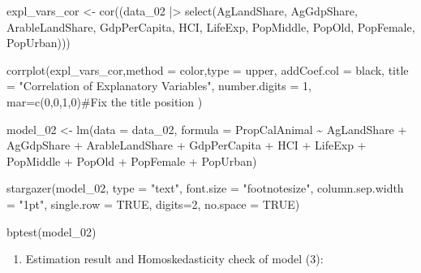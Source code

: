 \documentclass[
  letterpaper,
  DIV=11,
  numbers=noendperiod]{scrartcl}
\newenvironment{Shaded}{\begin{snugshade}}{\end{snugshade}}
\newcommand{\AttributeTok}[1]{\textcolor[rgb]{0.40,0.45,0.13}{#1}}
\newcommand{\CommentTok}[1]{\textcolor[rgb]{0.37,0.37,0.37}{#1}}
\newcommand{\ConstantTok}[1]{\textcolor[rgb]{0.56,0.35,0.01}{#1}}
\newcommand{\DecValTok}[1]{\textcolor[rgb]{0.68,0.00,0.00}{#1}}
\newcommand{\FunctionTok}[1]{\textcolor[rgb]{0.28,0.35,0.67}{#1}}
\newcommand{\NormalTok}[1]{\textcolor[rgb]{0.00,0.23,0.31}{#1}}
\newcommand{\OtherTok}[1]{\textcolor[rgb]{0.00,0.23,0.31}{#1}}
\newcommand{\SpecialCharTok}[1]{\textcolor[rgb]{0.37,0.37,0.37}{#1}}
\newcommand{\StringTok}[1]{\textcolor[rgb]{0.13,0.47,0.30}{#1}}
\providecommand{\tightlist}{%
  \setlength{\itemsep}{0pt}\setlength{\parskip}{0pt}}\usepackage{longtable,booktabs,array}
\begin{document}
\begin{Shaded}
\begin{Highlighting}[]
\NormalTok{expl\_vars\_cor }\OtherTok{\textless{}{-}} \FunctionTok{cor}\NormalTok{((data\_02 }\SpecialCharTok{|\textgreater{}}  \FunctionTok{select}\NormalTok{(AgLandShare, AgGdpShare, ArableLandShare, GdpPerCapita, HCI, LifeExp, PopMiddle, PopOld, PopFemale, PopUrban)))}

\FunctionTok{corrplot}\NormalTok{(expl\_vars\_cor,}\AttributeTok{method =} \StringTok{\textquotesingle{}color\textquotesingle{}}\NormalTok{,}\AttributeTok{type =} \StringTok{\textquotesingle{}upper\textquotesingle{}}\NormalTok{, }\AttributeTok{addCoef.col =} \StringTok{\textquotesingle{}black\textquotesingle{}}\NormalTok{, }
         \AttributeTok{title =} \StringTok{"Correlation of Explanatory Variables"}\NormalTok{,}
         \AttributeTok{number.digits =} \DecValTok{1}\NormalTok{,  }\AttributeTok{mar=}\FunctionTok{c}\NormalTok{(}\DecValTok{0}\NormalTok{,}\DecValTok{0}\NormalTok{,}\DecValTok{1}\NormalTok{,}\DecValTok{0}\NormalTok{)}\CommentTok{\#Fix the title position}
\NormalTok{         )}

\NormalTok{model\_02 }\OtherTok{\textless{}{-}} \FunctionTok{lm}\NormalTok{(}\AttributeTok{data =}\NormalTok{ data\_02, }
               \AttributeTok{formula =}\NormalTok{ PropCalAnimal }\SpecialCharTok{\textasciitilde{}}\NormalTok{ AgLandShare }\SpecialCharTok{+}\NormalTok{ AgGdpShare }\SpecialCharTok{+} 
\NormalTok{                 ArableLandShare }\SpecialCharTok{+}\NormalTok{ GdpPerCapita }\SpecialCharTok{+}\NormalTok{ HCI }\SpecialCharTok{+}\NormalTok{ LifeExp }\SpecialCharTok{+}\NormalTok{ PopMiddle }\SpecialCharTok{+}
\NormalTok{                 PopOld }\SpecialCharTok{+}\NormalTok{ PopFemale }\SpecialCharTok{+}\NormalTok{ PopUrban)}

\FunctionTok{stargazer}\NormalTok{(model\_02, }\AttributeTok{type =} \StringTok{"text"}\NormalTok{, }\AttributeTok{font.size =} \StringTok{"footnotesize"}\NormalTok{, }
          \AttributeTok{column.sep.width =} \StringTok{"1pt"}\NormalTok{, }\AttributeTok{single.row =} \ConstantTok{TRUE}\NormalTok{,}
          \AttributeTok{digits=}\DecValTok{2}\NormalTok{, }\AttributeTok{no.space =} \ConstantTok{TRUE}\NormalTok{)}

\FunctionTok{bptest}\NormalTok{(model\_02)}
\end{Highlighting}
\end{Shaded}

\begin{enumerate}
\def\labelenumi{\arabic{enumi}.}
\setcounter{enumi}{2}
\tightlist
\item
  Estimation result and Homoskedasticity check of model (3):
\end{enumerate}
\end{document}
